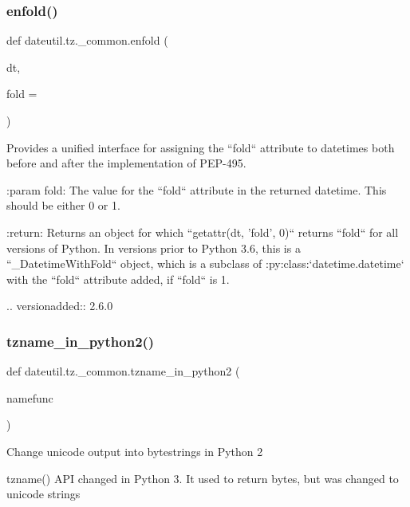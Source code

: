 \subsubsection{\texorpdfstring{enfold()}{enfold()}}
{\footnotesize\ttfamily def dateutil.\+tz.\+\_\+common.\+enfold (\begin{DoxyParamCaption}\item[{}]{dt,  }\item[{}]{fold = {} }\end{DoxyParamCaption})}

\begin{DoxyVerb}Provides a unified interface for assigning the ``fold`` attribute to
datetimes both before and after the implementation of PEP-495.

:param fold:
    The value for the ``fold`` attribute in the returned datetime. This
    should be either 0 or 1.

:return:
    Returns an object for which ``getattr(dt, 'fold', 0)`` returns
    ``fold`` for all versions of Python. In versions prior to
    Python 3.6, this is a ``_DatetimeWithFold`` object, which is a
    subclass of :py:class:`datetime.datetime` with the ``fold``
    attribute added, if ``fold`` is 1.

.. versionadded:: 2.6.0
\end{DoxyVerb}
 \mbox{\label{namespacedateutil_1_1tz_1_1__common_a589776d93a5a80470ff37521c784d7f3}} 
\subsubsection{\texorpdfstring{tzname\+\_\+in\+\_\+python2()}{tzname\_in\_python2()}}
{\footnotesize\ttfamily def dateutil.\+tz.\+\_\+common.\+tzname\+\_\+in\+\_\+python2 (\begin{DoxyParamCaption}\item[{}]{namefunc }\end{DoxyParamCaption})}

\begin{DoxyVerb}Change unicode output into bytestrings in Python 2

tzname() API changed in Python 3. It used to return bytes, but was changed
to unicode strings
\end{DoxyVerb}
 

